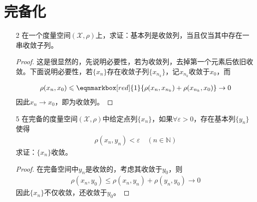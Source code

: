 	\section{完备化}
	\begin{enumerate}[leftmargin=2cm, label=\arabic*]
		\item[2] 在一个度量空间$(\mathscr{X},\rho)$上，求证：基本列是收敛列，当且仅当其中存在一串收敛子列。
		\begin{proof}
			这是很显然的，先说明必要性，若为收敛列，去掉第一个元素后依旧收敛。下面说明必要性，若$\{x_n\}$存在收敛子列$\{x_{n_k}\}$，记$x_{n_k}$收敛于$x_0$，而
			
			\begin{align*}
				\rho(x_n, x_0) \leqslant \eqnmarkbox[red]{1}{\rho(x_n, x_{n_k}) + \rho(x_{n_k}, x_0)} \to 0
			\end{align*}
			因此$x_n\to x_0$，即为收敛列。
		\end{proof}
		
		\item[5] 在完备的度量空间$(\mathscr{X},\rho)$中给定点列$\{x_n\}$，如果$\forall \varepsilon>0$，存在基本列$\{y_n\}$使得
		\begin{align*}
			\rho(x_n, y_n) < \varepsilon \quad (n\in\mathbb{N})
		\end{align*}
		求证：$\{x_n\}$收敛。
		\begin{proof}
			在完备空间中$y_n$是收敛的，考虑其收敛于$y_0$，则
			\begin{align*}
				\rho(x_n, y_0) \leqslant \rho(x_n,y_n) + \rho(y_n,y_0)\to 0
			\end{align*}
			因此$\{x_n\}$不仅收敛，还收敛于$y_0$。
		\end{proof}
	\end{enumerate}
	
